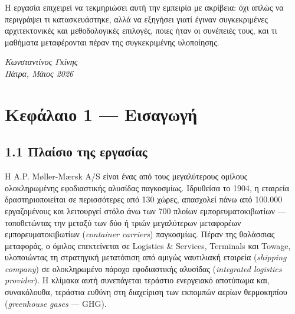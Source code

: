 \documentclass[11pt,a4paper,greek,twoside]{template-xe}
\begin{document}
Η εργασία επιχειρεί να τεκμηριώσει αυτή την εμπειρία με ακρίβεια: όχι
απλώς να περιγράψει τι κατασκευάστηκε, αλλά να εξηγήσει γιατί έγιναν
συγκεκριμένες αρχιτεκτονικές και μεθοδολογικές επιλογές, ποιες ήταν οι
συνέπειές τους, και τι μαθήματα μεταφέρονται πέραν της συγκεκριμένης
υλοποίησης.

\begin{flushright}
\textit{Κωνσταντίνος Γκίνης}\\
\textit{Πάτρα, Μάιος 2026}
\end{flushright}

\tableofcontents

\listoffigures

\mainmatter

\pagebreak

\chapter{Κεφάλαιο 1 ---
Εισαγωγή}\label{ux3baux3b5ux3c6ux3acux3bbux3b1ux3b9ux3bf-1-ux3b5ux3b9ux3c3ux3b1ux3b3ux3c9ux3b3ux3ae}

\section{1.1 Πλαίσιο της
εργασίας}\label{ux3c0ux3bbux3b1ux3afux3c3ux3b9ux3bf-ux3c4ux3b7ux3c2-ux3b5ux3c1ux3b3ux3b1ux3c3ux3afux3b1ux3c2}

Η A.P. Møller-Mærsk A/S είναι ένας από τους μεγαλύτερους ομίλους
ολοκληρωμένης εφοδιαστικής αλυσίδας παγκοσμίως. Ιδρυθείσα το 1904, η
εταιρεία δραστηριοποιείται σε περισσότερες από 130 χώρες, απασχολεί πάνω
από 100.000 εργαζομένους και λειτουργεί στόλο άνω των 700 πλοίων
εμπορευματοκιβωτίων --- τοποθετώντας την μεταξύ των δύο ή τριών
μεγαλύτερων μεταφορέων εμπορευματοκιβωτίων (\emph{container carriers})
παγκοσμίως. Πέραν της θαλάσσιας μεταφοράς, ο όμιλος επεκτείνεται σε
Logistics \& Services, Terminals και Towage, υλοποιώντας τη στρατηγική
μετατόπιση από αμιγώς ναυτιλιακή εταιρεία (\emph{shipping company}) σε
ολοκληρωμένο πάροχο εφοδιαστικής αλυσίδας (\emph{integrated logistics
provider}). Η κλίμακα αυτή συνεπάγεται τεράστιο ενεργειακό αποτύπωμα
και, συνακόλουθα, τεράστια ευθύνη στη διαχείριση των εκπομπών αερίων
θερμοκηπίου (\emph{greenhouse gases} --- GHG).
\end{document}
